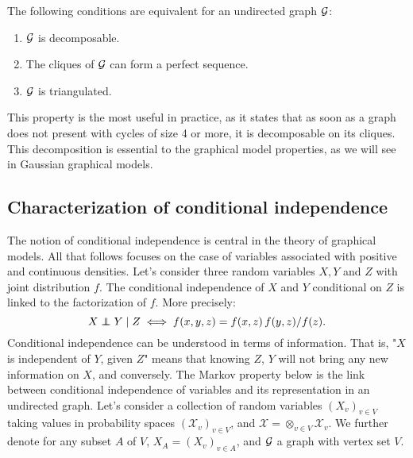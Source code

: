\begin{prop}
\label{decomp}
The following conditions are equivalent for an undirected graph $\mathcal{G}$:
\begin{enumerate}[label=(\roman*)]
\item $\mathcal{G}$ is decomposable.
\item The cliques of $\mathcal{G}$ can form a perfect sequence.
\item $\mathcal{G}$ is triangulated.
\end{enumerate}
\end{prop}

 This property is the most useful in practice, as it states that as soon as a graph does not present with cycles of size 4 or more, it is decomposable on its cliques. This decomposition is essential to the graphical model properties, as we will see in Gaussian graphical models.
 
\subsection{Characterization of conditional independence}
The notion of conditional independence is central in the theory of graphical models. All that follows focuses on the case of variables associated with positive and continuous densities. Let's consider three random variables $X,Y$ and $Z$ with joint distribution $f$. The conditional independence of $X$ and $Y$ conditional on $Z$ is linked to the factorization of $f$. More precisely: 
$$X \independent Y \mid Z \iff f(x,y,z) = f(x,z) \, f(y,z)/f(z). $$
Conditional independence can be understood in terms of information. That is, "$X$ is independent of $Y$, given $Z$" means that knowing $Z$, $Y$ will not bring any new information on $X$, and conversely. The Markov property below is the link between conditional independence of variables and its representation in an undirected graph. Let's consider a collection of random variables $(X_v)_{v\in V}$ taking values in probability spaces $(\mathcal{X}_v)_{v\in V}$, and $\mathcal{X}=\otimes_{v\in V} \mathcal{X}_v$. We further denote for any subset $A$ of $V$, $X_A=(X_v)_{v\in A}$, and $\mathcal{G}$ a graph with vertex set $V$. 

